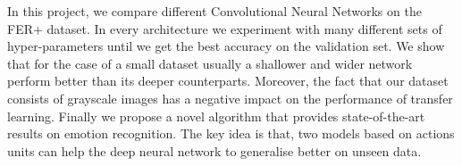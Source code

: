 In this project, we compare different Convolutional Neural Networks on the FER+ dataset. In every architecture we experiment with many different sets of hyper-parameters until we get the best accuracy on the validation set. We show that for the case of a small dataset usually a shallower and wider network perform better than its deeper counterparts. Moreover, the fact that our dataset consists of grayscale images has a negative impact on the performance of transfer learning. Finally we propose a novel algorithm that provides state-of-the-art results on emotion recognition. The key idea is that, two models based on actions units can help the deep neural network to generalise better on unseen data. 

\afterpage{\blankpage}